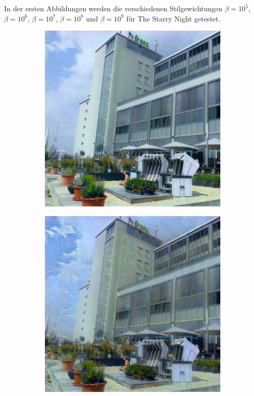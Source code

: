 In der ersten Abbildungen werden die verschiedenen
Stilgewichtungen $ \beta = 10^{5} $, $ \beta = 10^{6} $, $ \beta = 10^{7} $, $ \beta = 10^{8} $ und $ \beta = 10^{9} $ für The Starry Night getestet.

\begin{figure}[H]
    \centering
    \begin{subfigure}[h]{0.15\textwidth}
        \centering
        \includegraphics[width=\textwidth]{resources/content/experiments/a__starry_night__768x768__style-weight_1e+05__tv-weight_0e+00.jpg}
    \end{subfigure}
    \begin{subfigure}[h]{0.15\textwidth}
        \centering
        \includegraphics[width=\textwidth]{resources/content/experiments/a__starry_night__768x768__style-weight_1e+06__tv-weight_0e+00.jpg}

\end{subfigure}
\end{figure}
